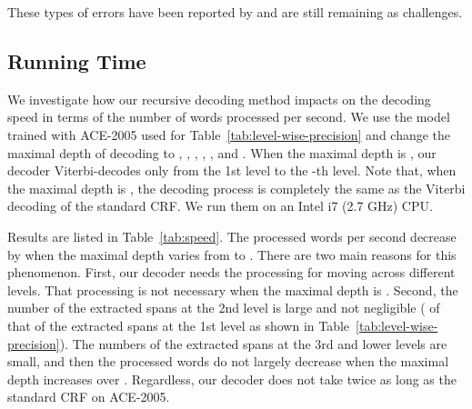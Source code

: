 \documentclass[11pt,a4paper]{article}
\def\tabref#1{Table~\ref{#1}}
\begin{document}
These types of errors have been reported by \citet{katiyar-cardie-2018-nested,ju-etal-2018-neural,lin-etal-2019-sequence} and are still remaining as challenges.

\subsection{Running Time}

\begin{table}[t!]
\centering
\small
{}
\caption{Decoding speed on ACE-2005.}\label{tab:speed}
\end{table}

We investigate how our recursive decoding method impacts on the decoding speed in terms of the number of words processed per second.
We use the model trained with ACE-2005 used for \tabref{tab:level-wise-precision} and change the maximal depth of decoding to , , , , , and . 
When the maximal depth is , our decoder Viterbi-decodes only from the 1st level to the -th level.
Note that, when the maximal depth is , the decoding process is completely the same as the Viterbi decoding of the standard CRF.
We run them on an Intel i7 (2.7 GHz) CPU.

Results are listed in \tabref{tab:speed}.
The processed words per second decrease by  when the maximal depth varies from  to .
There are two main reasons for this phenomenon.
First, our decoder needs the processing for moving across different levels.
That processing is not necessary when the maximal depth is .
Second, the number of the extracted spans at the 2nd level is large and not negligible ( of that of the extracted spans at the 1st level as shown in \tabref{tab:level-wise-precision}).
The numbers of the extracted spans at the 3rd and lower levels are small, and then the processed words do not largely decrease when the maximal depth increases over .
Regardless, our decoder does not take twice as long as the standard CRF on ACE-2005.
\end{document}
